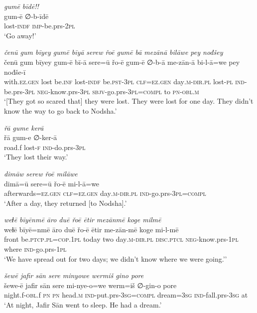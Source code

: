 \ea \label{ŠJ.38}
\textit{gumē bīdē!!} \\ 
\gll gum-ē ∅-b-īdē \\ 
 lost\textsc{-indf} \textsc{imp-}be.prs-\textsc{2pl} \\ 
\glt `Go away!'
\z 
 
\ea \label{ŠJ.39}
\textit{čenū gum bīyey gumē bīyā serew řoē gumē bā mezānā bilāwe pey nođšey} \\ 
\gll čenū gum bīyey gum-ē bī-ā sere=ū řo-ē gum-ē ∅-b-ā me-zān-ā bi-l-ā=we pey nođše-ī \\ 
 with\textsc{.ez.gen} lost be\textsc{.inf} lost\textsc{-indf} be\textsc{.pst}\textsc{-3pl} \textsc{clf}\textsc{=ez.gen} day\textsc{.m}\textsc{-dir}\textsc{.pl} lost\textsc{\textsc{-pl}} \textsc{ind-}be.prs\textsc{-3pl} \textsc{neg-}know.prs\textsc{-3pl} \textsc{sbjv-}go.prs\textsc{-3pl}\textsc{=compl} to \textsc{pn}\textsc{-obl}\textsc{.m} \\ 
\glt `[They got so scared that] they were lost. They were lost for one day. They didn’t know the way to go back to Nodsha.'
\z 
 
\ea \label{ŠJ.41}
\textit{řā gume kerā} \\ 
\gll řā gum-e ∅-ker-ā \\ 
 road.f lost\textsc{-f} \textsc{ind-}do.prs\textsc{-3pl} \\ 
\glt `They lost their way.'
\z 
 
\ea \label{ŠJ.42}
\textit{dimāw serew řoē milāwe} \\ 
\gll dimā=ū sere=ū řo-ē mi-l-ā=we \\ 
 afterwards\textsc{=ez.gen} \textsc{clf}\textsc{=ez.gen} day\textsc{.m}\textsc{-dir}\textsc{.pl} \textsc{ind-}go.prs\textsc{-3pl}\textsc{=compl} \\ 
\glt `After a day, they returned [to Nodsha].'
\z 
 
\ea \label{ŠJ.45}
\textit{weɫē bīyēnmē āro duē řoē ētir mezānmē koge milmē} \\ 
\gll weɫē bīyē=nmē āro duē řo-ē ētir me-zān-mē koge mi-l-mē \\ 
 front be\textsc{.ptcp}\textsc{.pl}\textsc{=cop}\textsc{.\textsc{1pl}} today two day\textsc{.m}\textsc{-dir}\textsc{.pl} \textsc{disc.ptcl} \textsc{neg-}know.prs\textsc{-\textsc{1pl}} where \textsc{ind-}go.prs\textsc{-\textsc{1pl}} \\ 
\glt `We have spread out for two days; we didn’t know where we were going.’'
\z 
 
\ea \label{ŠJ.46}
\textit{šewē jafir sān sere minyowe wermiš gino pore} \\ 
\gll šewe-ē jafir sān sere mi-nye-o=we werm=iš ∅-gin-o pore \\ 
 night.f\textsc{-obl}.f \textsc{pn} \textsc{pn} head\textsc{.m} \textsc{ind-}put.prs\textsc{-3sg}\textsc{=compl} dream\textsc{=3sg} \textsc{ind-}fall.prs\textsc{-3sg} at \\ 
\glt `At night, Jafir Sān went to sleep. He had a dream.'
\z 
 
